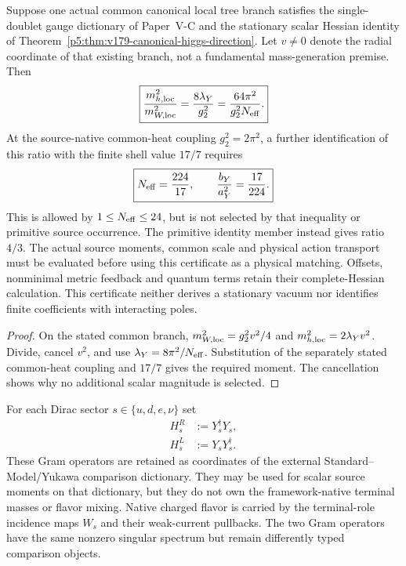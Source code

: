 \documentclass[12pt,a4paper]{article}
\begin{document}
\begin{proposition}
\label{p5:prop:v2211-scalar-gauge-shape-certificate}
Suppose one actual common canonical local tree branch satisfies the
single-doublet gauge dictionary of Paper~V-C and the stationary scalar
Hessian identity of Theorem~\ref{p5:thm:v179-canonical-higgs-direction}.
Let \(v\ne0\) denote the radial coordinate of that existing branch,
not a fundamental mass-generation premise.  Then
\[
 \boxed{\frac{m_{h,\rm loc}^2}{m_{W,\rm loc}^2}
 =\frac{8\lambda_Y}{g_2^2}
 =\frac{64\pi^2}{g_2^2N_{\rm eff}}.}
\]
At the source-native common-heat coupling \(g_2^2=2\pi^2\), a further
identification of this ratio with the finite shell value \(17/7\) requires
\[
 \boxed{N_{\rm eff}=\frac{224}{17},\qquad
 \frac{b_Y}{a_Y^2}=\frac{17}{224}.}
\]
This is allowed by \(1\le N_{\rm eff}\le24\), but is not selected by
that inequality or primitive source occurrence.  The primitive identity
member instead gives ratio \(4/3\).  The actual source moments, common
scale and physical action transport must be evaluated before using this
certificate as a physical matching.  Offsets, nonminimal metric feedback
and quantum terms retain their complete-Hessian calculation.  This
certificate neither derives a stationary vacuum nor identifies finite
coefficients with interacting poles.
\end{proposition}
\begin{proof}
On the stated common branch,
\(m_{W,\rm loc}^2=g_2^2v^2/4\) and
\(m_{h,\rm loc}^2=2\lambda_Yv^2\).  Divide, cancel \(v^2\), and use
\(\lambda_Y=8\pi^2/N_{\rm eff}\).  Substitution of the separately
stated common-heat coupling and \(17/7\) gives the required moment.
The cancellation shows why no additional scalar magnitude is selected.
\end{proof}

\begin{definition}
\label{p5:def:v355-yukawa-left-right-grams}
For each Dirac sector $s\in\{u,d,e,\nu\}$ set
\[
\begin{aligned}
 H_s^R&:=Y_s^\dagger Y_s,\\
 H_s^L&:=Y_sY_s^\dagger.
\end{aligned}
\]
These Gram operators are retained as coordinates of the external
Standard--Model/\allowbreak Yukawa comparison dictionary.  They may be used for scalar
source moments on that dictionary, but they do not own the framework-native
terminal masses or flavor mixing.  Native charged flavor is carried by the
terminal-role incidence maps $W_s$ and their weak-current pullbacks.  The two
Gram operators have the same nonzero singular spectrum but remain differently
typed comparison objects.
\end{definition}
\end{document}
